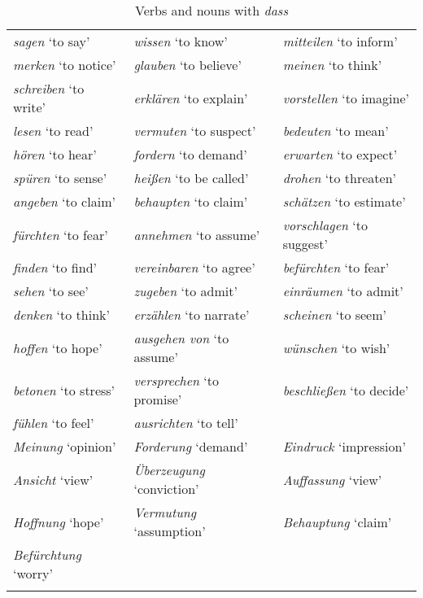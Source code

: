 \documentclass[output=paper]{LSP/langsci}
\begin{document}
\begin{table}
  \caption{Verbs and nouns with \emph{dass}}\label{bisiada:tab:dassvs}
  \begin{tabular}{lll}
    \lsptoprule
    \emph{sagen} `to say'       & \emph{wissen} `to know'           &\emph{mitteilen} `to inform'\\
    \emph{merken} `to notice'   & \emph{glauben} `to believe'       & \emph{meinen} `to think'\\
    \emph{schreiben} `to write' & \emph{erklären} `to explain'      &\emph{vorstellen} `to imagine'\\
    \emph{lesen} `to read'      &  \emph{vermuten} `to suspect'     &\emph{bedeuten} `to mean'\\
    \emph{hören} `to hear'      & \emph{fordern} `to demand'        &\emph{erwarten} `to expect'\\
    \emph{spüren} `to sense'    &  \emph{heißen} `to be called'     &\emph{drohen} `to threaten'\\
    \emph{angeben} `to claim'   & \emph{behaupten} `to claim'       &\emph{schätzen} `to estimate' \\
    \emph{fürchten} `to fear'   & \emph{annehmen} `to assume'       & \emph{vorschlagen} `to suggest'\\
    \emph{finden} `to find'     & \emph{vereinbaren} `to agree'     &\emph{befürchten} `to fear'\\
    \emph{sehen} `to see'       & \emph{zugeben} `to admit'         & \emph{einräumen} `to admit'\\
    \emph{denken} `to think'    & \emph{erzählen} `to narrate'      &\emph{scheinen} `to seem'\\
    \emph{hoffen} `to hope'     & \emph{ausgehen von} `to assume'   & \emph{wünschen} `to wish'\\
    \emph{betonen} `to stress'  & \emph{versprechen} `to promise'   &\emph{beschließen} `to decide'\\
    \emph{fühlen} `to feel'     & \emph{ausrichten} `to tell'       & \\
    \midrule
    \emph{Meinung} `opinion'    & \emph{Forderung} `demand'         &\emph{Eindruck} `impression'\\
    \emph{Ansicht} `view'       &  \emph{Überzeugung} `conviction'  &\emph{Auffassung} `view'\\
    \emph{Hoffnung} `hope'      & \emph{Vermutung} `assumption'     & \emph{Behauptung} `claim'\\ 
    \emph{Befürchtung} `worry'  &                                   &\\
    \lspbottomrule
  \end{tabular}
\end{table}
\end{document}
